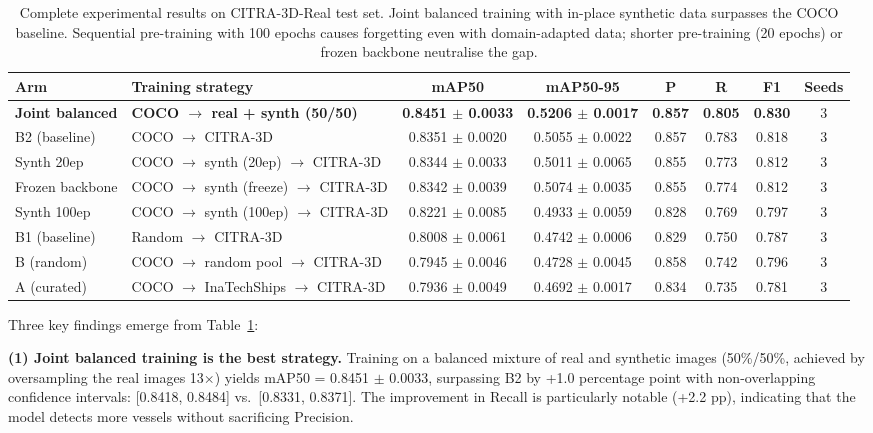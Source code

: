 \documentclass[a4paper,fleqn]{cas-dc}
\begin{document}
\begin{table}[!htbp]
\caption{Complete experimental results on CITRA-3D-Real test set. Joint balanced training with in-place synthetic data surpasses the COCO baseline. Sequential pre-training with 100 epochs causes forgetting even with domain-adapted data; shorter pre-training (20 epochs) or frozen backbone neutralise the gap.}\label{tab:main_results}
\begin{tabular}{@{}llcccccc@{}}
\toprule
Arm & Training strategy & mAP50 & mAP50-95 & P & R & F1 & Seeds \\
\midrule
\textbf{Joint balanced} & \textbf{COCO $\rightarrow$ real + synth (50/50)} & \textbf{0.8451 $\pm$ 0.0033} & \textbf{0.5206 $\pm$ 0.0017} & \textbf{0.857} & \textbf{0.805} & \textbf{0.830} & 3 \\
B2 (baseline) & COCO $\rightarrow$ CITRA-3D & 0.8351 $\pm$ 0.0020 & 0.5055 $\pm$ 0.0022 & 0.857 & 0.783 & 0.818 & 3 \\
Synth 20ep & COCO $\rightarrow$ synth (20ep) $\rightarrow$ CITRA-3D & 0.8344 $\pm$ 0.0033 & 0.5011 $\pm$ 0.0065 & 0.855 & 0.773 & 0.812 & 3 \\
Frozen backbone & COCO $\rightarrow$ synth (freeze) $\rightarrow$ CITRA-3D & 0.8342 $\pm$ 0.0039 & 0.5074 $\pm$ 0.0035 & 0.855 & 0.774 & 0.812 & 3 \\
Synth 100ep & COCO $\rightarrow$ synth (100ep) $\rightarrow$ CITRA-3D & 0.8221 $\pm$ 0.0085 & 0.4933 $\pm$ 0.0059 & 0.828 & 0.769 & 0.797 & 3 \\
B1 (baseline) & Random $\rightarrow$ CITRA-3D & 0.8008 $\pm$ 0.0061 & 0.4742 $\pm$ 0.0006 & 0.829 & 0.750 & 0.787 & 3 \\
B (random) & COCO $\rightarrow$ random pool $\rightarrow$ CITRA-3D & 0.7945 $\pm$ 0.0046 & 0.4728 $\pm$ 0.0045 & 0.858 & 0.742 & 0.796 & 3 \\
A (curated) & COCO $\rightarrow$ InaTechShips $\rightarrow$ CITRA-3D & 0.7936 $\pm$ 0.0049 & 0.4692 $\pm$ 0.0017 & 0.834 & 0.735 & 0.781 & 3 \\
\bottomrule
\end{tabular}
\end{table}

Three key findings emerge from Table~\ref{tab:main_results}:

\textbf{(1) Joint balanced training is the best strategy.} Training on a balanced mixture of real and synthetic images (50\%/50\%, achieved by oversampling the real images 13$\times$) yields mAP50 = 0.8451 $\pm$ 0.0033, surpassing B2 by +1.0 percentage point with non-overlapping confidence intervals: [0.8418, 0.8484] vs.\ [0.8331, 0.8371]. The improvement in Recall is particularly notable (+2.2 pp), indicating that the model detects more vessels without sacrificing Precision.
\end{document}
